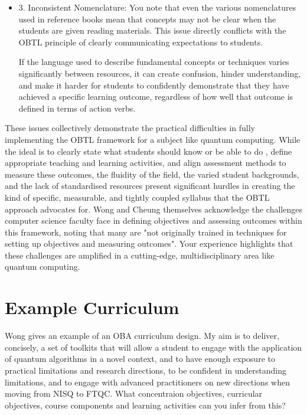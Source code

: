 \documentclass[11pt,a4paper]{article}
\begin{document}
\begin{itemize}
\item 3. Inconsistent Nomenclature: You note that even the various nomenclatures used in reference books mean that concepts may not be clear when the students are given reading materials. This issue directly conflicts with the OBTL principle of clearly communicating expectations to students. 

If the language used to describe fundamental concepts or techniques varies significantly between resources, it can create confusion, hinder understanding, and make it harder for students to confidently demonstrate that they have achieved a specific learning outcome, regardless of how well that outcome is defined in terms of action verbs.

\end{itemize}

These issues collectively demonstrate the practical difficulties in fully implementing the OBTL framework for a subject like quantum computing. While the ideal is to clearly state what students should know or be able to do
, define appropriate teaching and learning activities, and align assessment methods to measure these outcomes, the fluidity of the field, the varied student backgrounds, and the lack of standardised resources present significant hurdles in creating the kind of specific, measurable, and tightly coupled syllabus that the OBTL approach advocates for. Wong and Cheung themselves acknowledge the challenges computer science faculty face in defining objectives and assessing outcomes within this framework, noting that many are "not originally trained in techniques for setting up objectives and measuring outcomes". Your experience highlights that these challenges are amplified in a cutting-edge, multidisciplinary area like quantum computing.

\section{Example Curriculum}

Wong gives an example of an OBA curriculum design.  My aim is to deliver, concisely, a set of toolkits that will allow a student to engage with the application of quantum algorithms in a novel context, and to have enough exposure to practical limitations and research directions, to be confident in understanding limitations, and to engage with advanced practitioners on new directions when moving from NISQ to FTQC.  What concentraion objectives, curricular objectives, course components and learning activities can you infer from this?
\end{document}
